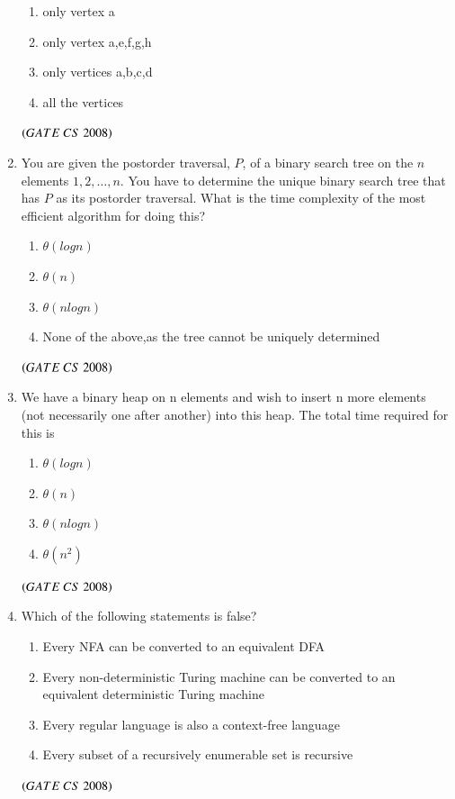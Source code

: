 \documentclass[journal, onecolumn]{IEEEtran}
\numberwithin{equation}{enumi}
\numberwithin{figure}{enumi}
\begin{document}
\begin{enumerate}
\vspace{-1em}%
\begin{multicols}{2}
\begin{enumerate}
   \item only vertex a
   \item only vertex a,e,f,g,h
   \item only vertices a,b,c,d
   \item all the vertices
\end{enumerate}
\end{multicols}
\hfill $\left(GATE\ CS\  2008\right)$

\item You are given the postorder traversal, $P$, of a binary search tree on the $n$ elements $1, 2,\dots,n$. You have to determine the unique binary search tree that has $P$ as its postorder traversal. What is the time complexity of the most efficient algorithm for doing this? 
\begin{enumerate}
   \item $\theta(logn)$
   \item $\theta(n)$
   \item $\theta(nlogn)$
   \item None of the above,as the tree cannot be uniquely determined 
 \end{enumerate}
 \hfill $\left(GATE\ CS\  2008\right)$
\bigskip 

\item We have a binary heap on n elements and wish to insert n more elements (not necessarily one after another) into this heap. The total time required for this is
\vspace{-1em}%
\begin{multicols}{4}
\begin{enumerate}
   \item $\theta(logn)$
   \item $\theta(n)$
   \item $\theta(nlogn)$
   \item $\theta(n^2)$
\end{enumerate}
\end{multicols}
\hfill $\left(GATE\ CS\  2008\right)$

\item Which of the following statements is false?
\begin{enumerate}
   \item  Every NFA can be converted to an equivalent DFA 
   \item Every non-deterministic Turing machine can be converted to an equivalent deterministic Turing machine 
   \item Every regular language is also a context-free language 
   \item Every subset of a recursively enumerable set is recursive
\end{enumerate}
\hfill $\left(GATE\ CS\  2008\right)$
\bigskip


\end{enumerate}
\end{document}

